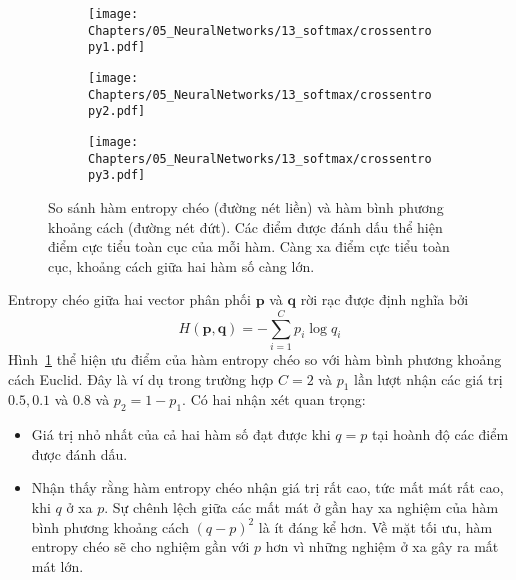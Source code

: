 \begin{figure}[t]
\begin{subfigure}{0.325\textwidth}
\texttt{[image: Chapters/05\_NeuralNetworks/13\_softmax/crossentropy1.pdf]}
\caption{}
\end{subfigure}
\begin{subfigure}{0.325\textwidth}
\texttt{[image: Chapters/05\_NeuralNetworks/13\_softmax/crossentropy2.pdf]}
\caption{}
\end{subfigure}
\begin{subfigure}{0.325\textwidth}
\texttt{[image: Chapters/05\_NeuralNetworks/13\_softmax/crossentropy3.pdf]}
\caption{}
\end{subfigure}

\caption{
So sánh hàm entropy chéo (đường nét liền) và hàm bình phương khoảng cách
(đường nét đứt). Các điểm được đánh dấu thể hiện điểm cực tiểu toàn cục
của mỗi hàm. Càng xa điểm cực tiểu toàn cục, khoảng cách giữa hai hàm số
càng lớn. }
\label{fig:13_4}
\end{figure}
Entropy chéo giữa hai vector phân phối $\mathbf{p}$ và $\mathbf{q}$ rời rạc
được định nghĩa bởi
\begin{equation}
\label{eqn:13_1}
H(\mathbf{p}, \mathbf{q}) =-\sum_{i=1}^C p_i \log q_i
\end{equation}
Hình~\ref{fig:13_4} thể hiện ưu điểm của hàm entropy chéo so với hàm bình
phương khoảng cách Euclid. Đây là ví dụ trong trường hợp $C = 2$ và $p_1$ lần
lượt nhận các giá trị $0.5, 0.1$ và $0.8$ và $p_2 = 1 - p_1$.
Có hai nhận xét quan trọng:
\begin{itemize}
\item Giá trị nhỏ nhất của cả hai hàm số đạt được khi $q = p$ tại hoành độ các điểm được đánh dấu.

\item Nhận thấy rằng hàm entropy chéo nhận giá trị rất cao, tức mất mát rất
cao, khi $q$ ở xa $p$. Sự chênh lệch giữa các mất mát ở gần hay xa
nghiệm của hàm bình phương khoảng cách $(q - p)^2$ là ít đáng kể hơn. Về mặt tối
ưu, hàm entropy chéo sẽ cho nghiệm {gần} với $p$ hơn vì những nghiệm ở xa gây ra mất mát lớn.
\end{itemize}

